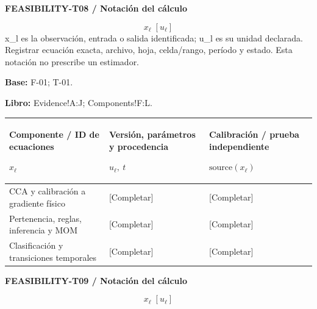 \textbf{FEASIBILITY-T08 / Notación del cálculo}\par
{\fontsize{9}{11}\selectfont\[ x_{\ell}\;[u_{\ell}] \]}
x\_l es la observación, entrada o salida identificada; u\_l es su unidad declarada. Registrar ecuación exacta, archivo, hoja, celda/rango, período y estado. Esta notación no prescribe un estimador.\par
\textbf{Base:} F-01; T-01.\par
\textbf{Libro:} Evidence!A:J; Components!F:L.\par\endgroup
{\sffamily\fontsize{8.3}{10.3}\selectfont\begin{longtable}{@{}P{61.14mm} P{54.44mm} P{49.49mm}@{}}
\toprule
\textbf{Componente / ID de ecuaciones}\par {\normalfont\fontsize{8.2}{10}\selectfont $x_{\ell}$} & \textbf{Versión, parámetros y procedencia}\par {\normalfont\fontsize{8.2}{10}\selectfont $u_{\ell},\ t$} & \textbf{Calibración / prueba independiente}\par {\normalfont\fontsize{8.2}{10}\selectfont $\text{source}(x_{\ell})$}\\\midrule\endhead
\rule{0pt}{7.7mm}CCA y calibración a gradiente físico & [Completar] & [Completar]\\\hline
\rule{0pt}{7.7mm}Pertenencia, reglas, inferencia y MOM & [Completar] & [Completar]\\\hline
\rule{0pt}{7.7mm}Clasificación y transiciones temporales & [Completar] & [Completar]\\\hline
\end{longtable}}
\par\begingroup\sffamily\fontsize{8}{10}\selectfont\color{NEBGreen}\setlength{\parskip}{2pt}\setlength{\abovedisplayskip}{4pt}\setlength{\belowdisplayskip}{4pt}\setlength{\abovedisplayshortskip}{2pt}\setlength{\belowdisplayshortskip}{3pt}
\textbf{FEASIBILITY-T09 / Notación del cálculo}\par
{\fontsize{9}{11}\selectfont\[ x_{\ell}\;[u_{\ell}] \]}
